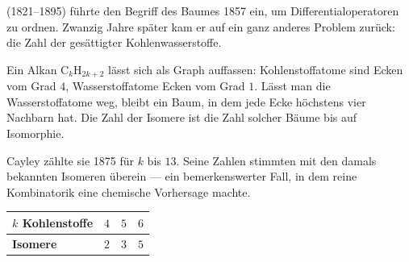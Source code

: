 \begin{geschichte}
 (1821--1895) führte den Begriff des Baumes 1857 ein, um Differentialoperatoren zu ordnen. Zwanzig Jahre später kam er auf ein ganz anderes Problem zurück: die Zahl der  gesättigter Kohlenwasserstoffe.

Ein Alkan $\mathrm{C}_k\mathrm{H}_{2k+2}$ lässt sich als Graph auffassen: Kohlenstoffatome sind Ecken vom Grad $4$, Wasserstoffatome Ecken vom Grad $1$. Lässt man die Wasserstoffatome weg, bleibt ein Baum, in dem jede Ecke höchstens vier Nachbarn hat. Die Zahl der Isomere ist die Zahl solcher Bäume bis auf Isomorphie.

Cayley zählte sie 1875 für $k$ bis $13$. Seine Zahlen stimmten mit den damals bekannten Isomeren überein --- ein bemerkenswerter Fall, in dem reine Kombinatorik eine chemische Vorhersage machte.

\begin{center}
{\small
\renewcommand{\arraystretch}{1.4}
\begin{tabular}{@{}P{2.2cm}P{1.6cm}P{1.6cm}P{1.6cm}@{}}
\toprule
\textbf{$k$ Kohlenstoffe} & $4$ & $5$ & $6$\\
\midrule
\textbf{Isomere} & $2$ & $3$ & $5$\\
\bottomrule
\end{tabular}}
\end{center}

\begin{center}
\begin{minipage}{0.9\textwidth}
\end{minipage}
\end{center}
\end{geschichte}

